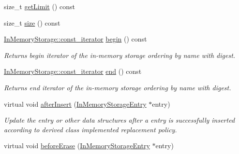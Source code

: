 \begin{DoxyCompactItemize}
size\+\_\+t \hyperlink{classndn_1_1util_1_1InMemoryStorage_a8115299a9d7ac7193258678914fe55d6}{get\+Limit} () const
\item 
size\+\_\+t \hyperlink{classndn_1_1util_1_1InMemoryStorage_a5e10dd4aad18433b311f171c8ebc6416}{size} () const
\item 
\hyperlink{classndn_1_1util_1_1InMemoryStorage_1_1const__iterator}{In\+Memory\+Storage\+::const\+\_\+iterator} \hyperlink{classndn_1_1util_1_1InMemoryStorage_acaf639e8e935d28d7e02cc1186c84ba2}{begin} () const
\begin{DoxyCompactList}\small\item\em Returns begin iterator of the in-\/memory storage ordering by name with digest. \end{DoxyCompactList}\item 
\hyperlink{classndn_1_1util_1_1InMemoryStorage_1_1const__iterator}{In\+Memory\+Storage\+::const\+\_\+iterator} \hyperlink{classndn_1_1util_1_1InMemoryStorage_a961b629b71ca731b894b04d7fe8853b6}{end} () const
\begin{DoxyCompactList}\small\item\em Returns end iterator of the in-\/memory storage ordering by name with digest. \end{DoxyCompactList}\item 
virtual void \hyperlink{classndn_1_1util_1_1InMemoryStorage_a4e2b2e50204f83707bab62edf3bf3ada}{after\+Insert} (\hyperlink{classndn_1_1util_1_1InMemoryStorageEntry}{In\+Memory\+Storage\+Entry} $\ast$entry)\hypertarget{classndn_1_1util_1_1InMemoryStorage_a4e2b2e50204f83707bab62edf3bf3ada}{}\label{classndn_1_1util_1_1InMemoryStorage_a4e2b2e50204f83707bab62edf3bf3ada}

\begin{DoxyCompactList}\small\item\em Update the entry or other data structures after a entry is successfully inserted according to derived class implemented replacement policy. \end{DoxyCompactList}\item 
virtual void \hyperlink{classndn_1_1util_1_1InMemoryStorage_a33d8eb2f0a6dd71a0957866c7784fb2c}{before\+Erase} (\hyperlink{classndn_1_1util_1_1InMemoryStorageEntry}{In\+Memory\+Storage\+Entry} $\ast$entry)\hypertarget{classndn_1_1util_1_1InMemoryStorage_a33d8eb2f0a6dd71a0957866c7784fb2c}{}\label{classndn_1_1util_1_1InMemoryStorage_a33d8eb2f0a6dd71a0957866c7784fb2c}


\end{DoxyCompactItemize}
